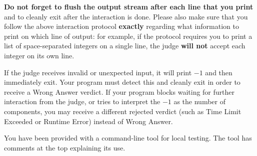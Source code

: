 

\textbf{Do not forget to flush the output stream after each line that you print} and to cleanly exit after the interaction is done. Please also make sure that you follow the above interaction protocol \textbf{exactly} regarding what information to print on which line of output: for example, if the protocol requires you to print a list of space-separated integers on a single line, the judge \textbf{will not} accept each integer on its own line.

If the judge receives invalid or unexpected input, it will print $-1$ and then immediately exit. Your program must detect this and cleanly exit in order to receive a Wrong Answer verdict. If your program blocks waiting for further interaction from the judge, or tries to interpret the $-1$ as the number of components, you may receive a different rejected verdict (such as Time Limit Exceeded or Runtime Error) instead of Wrong Answer.

You have been provided with a command-line tool for local testing. The tool has comments at the top explaining its use.